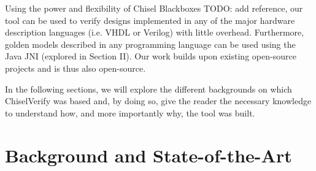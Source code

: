 \documentclass[conference]{IEEEtran}
\newcommand{\todo}[1]{{\color{olive} TODO: #1}}
\begin{document}
Using the power and flexibility of Chisel Blackboxes \todo{add reference}, our tool can be used to verify designs implemented in any
of the major hardware description languages (i.e. VHDL or Verilog) with little overhead. Furthermore, golden models described in any
programming language can be used using the Java JNI (explored in Section II). Our work builds upon existing open-source projects and 
is thus also open-source. 

In the following sections, we will explore the different backgrounds on which ChiselVerify was based and, by doing so, give the reader the 
necessary knowledge to understand how, and more importantly why, the tool was built.


\section{Background and State-of-the-Art}
\label{sec:background}
\end{document}
